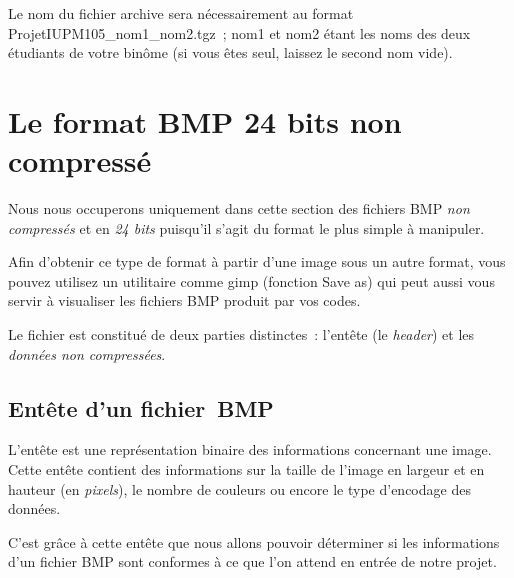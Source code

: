 \documentclass[a4paper]{article}
\begin{document}
Le nom du fichier archive sera n\'ecessairement au format
ProjetIUPM105\_nom1\_nom2.tgz~; nom1 et nom2 \'etant les noms des deux
\'etudiants de votre bin\^ome (si vous \^etes seul, laissez le second
nom vide).
\section{Le format BMP 24 bits non compress\'e}

Nous nous occuperons uniquement dans cette section des fichiers BMP
\emph{non compress\'es} et en \emph{24 bits} puisqu'il s'agit du format
le plus simple \`a manipuler.

Afin d'obtenir ce type de format \`a partir d'une image sous un autre
format, vous pouvez utilisez un utilitaire comme gimp (fonction Save
as) qui peut aussi vous servir \`a visualiser les fichiers BMP produit
par vos codes.

Le fichier est constitu\'e de deux parties distinctes~: l'ent\^ete (le
\emph{header}) et les \emph{donn\'ees non compress\'ees}.

\subsection{Ent\^ete d'un fichier~BMP}

L'ent\^ete est une repr\'esentation binaire des informations
concernant une image. Cette ent\^ete contient des informations sur la
taille de l'image en largeur et en hauteur (en \emph{pixels}), le
nombre de couleurs ou encore le type d'encodage des donn\'ees.

C'est gr\^ace \`a cette ent\^ete que nous allons pouvoir d\'eterminer
si les informations d'un fichier BMP sont conformes \`a ce que l'on
attend en entr\'ee de notre projet.
\end{document}
